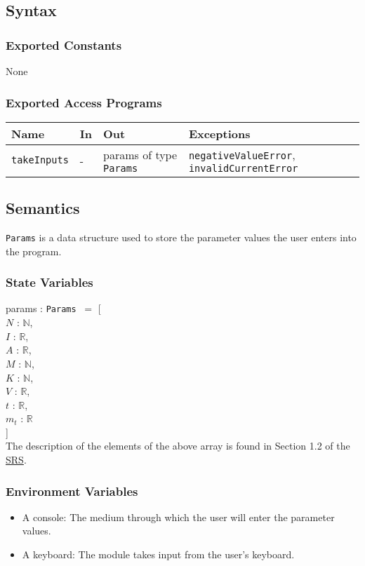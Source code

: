 \documentclass[12pt, titlepage]{article}
\begin{document}
\subsection{Syntax}

\subsubsection{Exported Constants}
None 

\subsubsection{Exported Access Programs}
\begin{center}
\begin{tabular}{p{3cm} p{4cm} p{4cm} p{3cm}}
\hline
\textbf{Name} & \textbf{In} & \textbf{Out} & \textbf{Exceptions} \\
\hline
\texttt{takeInputs} & - & params of type \texttt{Params} & \texttt{negativeValueError}, \texttt{invalidCurrentError} \\
\hline
\end{tabular}
\end{center}

\subsection{Semantics}
\texttt{Params} is a data structure used to store the parameter values the user enters into the program. 
\subsubsection{State Variables}
params : \texttt{Params} $\:= $ [ \\ 
$N$ : $\mathbb{N}$, \\
$I$ : $\mathbb{R}$, \\
$A$ : $\mathbb{R}$, \\
$M$ : $\mathbb{N}$, \\
$K$ : $\mathbb{N}$, \\
$V$ : $\mathbb{R}$, \\
$t$ : $\mathbb{R}$, \\
$m_t$ : $\mathbb{R}$ \\
] \\
The description of the elements of the above array is found in Section 1.2 of the \href{https://github.com/husseinsd1/optimal-em-arrangement/blob/main/docs/SRS/SRS.pdf}{SRS}.

\subsubsection{Environment Variables}
\begin{itemize}
  \item A console: The medium through which the user will enter the parameter values. 
  \item A keyboard: The module takes input from the user's keyboard. 
\end{itemize}
\end{document}
